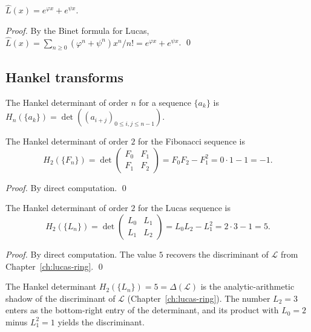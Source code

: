 \begin{lemma}
\label{fa_05:lem:05-luc-egf}
$\hat{L}(x) = e^{\varphi x} + e^{\psi x}$.
\end{lemma}

\begin{proof}
By the Binet formula for Lucas, $\hat{L}(x) = \sum_{n \ge 0} (\varphi^n + \psi^n) x^n/n!
= e^{\varphi x} + e^{\psi x}$. \qed
\end{proof}

\subsection{Hankel transforms}

\begin{definition}
\label{fa_05:def:05-hankel}
The Hankel determinant of order $n$ for a sequence $\{a_k\}$ is
$H_n(\{a_k\}) = \det((a_{i+j})_{0 \le i, j \le n-1})$.
\end{definition}

\begin{lemma}
\label{fa_05:lem:05-fib-hankel}
The Hankel determinant of order $2$ for the Fibonacci sequence is
\[
  H_2(\{F_n\}) = \det \begin{pmatrix} F_0 & F_1 \\ F_1 & F_2 \end{pmatrix} = F_0 F_2 - F_1^2 = 0 \cdot 1 - 1 = -1.
\]
\end{lemma}

\begin{proof}
By direct computation. \qed
\end{proof}

\begin{lemma}
\label{lem:05-luc-hankel}
The Hankel determinant of order $2$ for the Lucas sequence is
\[
  H_2(\{L_n\}) = \det \begin{pmatrix} L_0 & L_1 \\ L_1 & L_2 \end{pmatrix} = L_0 L_2 - L_1^2 = 2 \cdot 3 - 1 = 5.
\]
\end{lemma}

\begin{proof}
By direct computation. The value $5$ recovers the discriminant of
$\mathcal{L}$ from Chapter~\ref{ch:lucas-ring}. \qed
\end{proof}

\begin{remark}
The Hankel determinant $H_2(\{L_n\}) = 5 = \Delta(\mathcal{L})$ is the
analytic-arithmetic shadow of the discriminant of $\mathcal{L}$
(Chapter~\ref{ch:lucas-ring}). The number $L_2 = 3$ enters as
the bottom-right entry of the determinant, and its product with $L_0 = 2$
minus $L_1^2 = 1$ yields the discriminant.
\end{remark}

